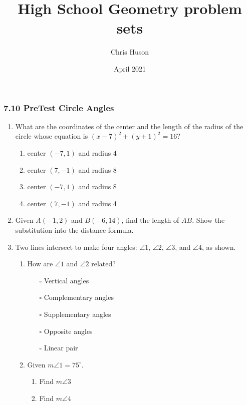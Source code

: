 \documentclass[12pt, twoside]{article}
\title{High School Geometry problem sets}
\author{Chris Huson}
\date{April 2021}
\begin{document}
\subsubsection*{7.10 PreTest Circle Angles}
\begin{enumerate}
\item What are the coordinates of the center and the length of the radius of the circle whose equation is $(x-7)^2+(y+1)^2=16$?
  \begin{enumerate}[itemsep=0.25cm]
    \item center $(-7,1)$ and radius 4
    \item center $(7,-1)$ and radius 8
    \item center $(-7,1)$ and radius 8
    \item center $(7,-1)$ and radius 4
  \end{enumerate}

\newpage
\item Given $A(-1,2)$ and $B(-6,14)$, find the length of $\overline{AB}$. Show the substitution into the distance formula.

\newpage
\item Two lines intersect to make four angles: $\angle 1$, $\angle 2$, $\angle 3$, and $\angle 4$, as shown.

  \begin{multicols}{2}  
    \begin{enumerate}
      \item How are $\angle 1$ and $\angle 2$ related?
        \begin{itemize}
          \item[$\square$] Vertical angles
          \item[$\square$] Complementary angles
          \item[$\square$] Supplementary angles
          \item[$\square$] Opposite angles
          \item[$\square$] Linear pair
        \end{itemize}
      \item Given $m\angle 1 = 75^\circ$.
        \begin{enumerate}
          \item Find $m\angle 3$ \vspace{0.5cm}
          \item Find $m\angle 4$ \vspace{2cm}
        \end{enumerate} 
        \end{enumerate}
  \end{multicols}
  

\end{enumerate}
\end{document}
